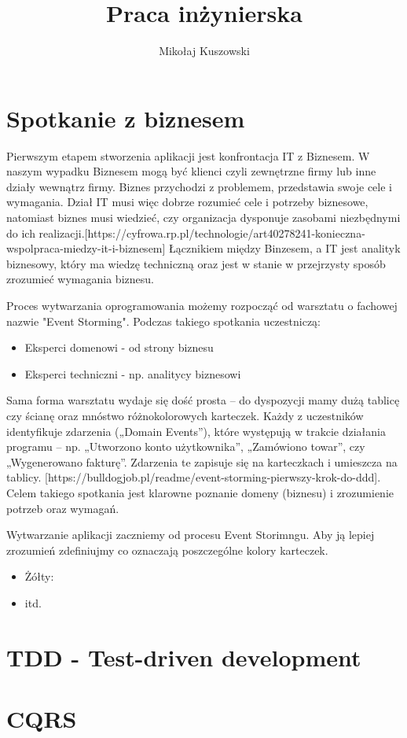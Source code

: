 \documentclass{article}
\title{Praca inżynierska}
\author{Mikołaj Kuszowski}
\begin{document}
\maketitle

\section{Spotkanie z biznesem}
      Pierwszym etapem stworzenia aplikacji jest konfrontacja IT z Biznesem. W naszym wypadku Biznesem mogą być klienci czyli zewnętrzne firmy lub inne działy wewnątrz firmy. Biznes przychodzi z problemem, przedstawia swoje cele i wymagania. Dział IT musi więc dobrze rozumieć cele i potrzeby biznesowe, natomiast biznes musi wiedzieć, czy organizacja dysponuje zasobami niezbędnymi do ich realizacji.[https://cyfrowa.rp.pl/technologie/art40278241-konieczna-wspolpraca-miedzy-it-i-biznesem] Łącznikiem między Binzesem, a IT jest analityk biznesowy, który ma wiedzę techniczną oraz jest w stanie w przejrzysty sposób zrozumieć wymagania biznesu.

      Proces wytwarzania oprogramowania możemy rozpocząć od warsztatu o fachowej nazwie "Event Storming". Podczas takiego spotkania uczestniczą:
      \begin{itemize}
            \item Eksperci domenowi - od strony biznesu
            \item Eksperci techniczni - np. analitycy biznesowi
      \end{itemize}

      Sama forma warsztatu wydaje się dość prosta – do dyspozycji mamy dużą tablicę czy ścianę oraz mnóstwo różnokolorowych karteczek. Każdy z uczestników identyfikuje zdarzenia („Domain Events”), które występują w trakcie działania programu – np. „Utworzono konto użytkownika”, „Zamówiono towar”, czy „Wygenerowano fakturę”. Zdarzenia te zapisuje się na karteczkach i umieszcza na tablicy. [https://bulldogjob.pl/readme/event-storming-pierwszy-krok-do-ddd]. Celem takiego spotkania jest klarowne poznanie domeny (biznesu) i zrozumienie potrzeb oraz wymagań.

      Wytwarzanie aplikacji zaczniemy od procesu Event Storimngu. Aby ją lepiej zrozumień zdefiniujmy co oznaczają poszczególne kolory karteczek.
      \begin{itemize}
            \item Żółty:
            \item itd.
      \end{itemize}
      
\section{TDD - Test-driven development}

\section{CQRS}
\end{document}
